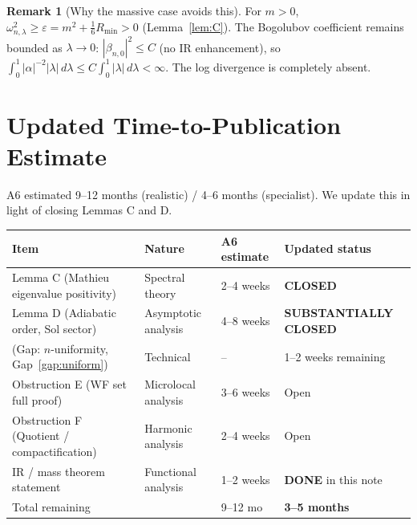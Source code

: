 \documentclass[11pt,a4paper]{article}
\theoremstyle{definition}
\newtheorem{remark}[theorem]{Remark}
\begin{document}
\begin{remark}[Why the massive case avoids this]
For $m > 0$, $\omega_{n,\lambda}^2 \geq \varepsilon = m^2 + \tfrac{1}{6}R_{\min} > 0$
(Lemma~\ref{lem:C}).  The Bogolubov coefficient remains bounded as $\lambda \to 0$:
$|\beta_{n,0}|^2 \leq C$ (no IR enhancement), so
$\int_0^1 |\alpha|^{-2}|\lambda|\,d\lambda \leq C\int_0^1 |\lambda|\,d\lambda < \infty$.
The log divergence is completely absent.
\end{remark}

\section{Updated Time-to-Publication Estimate}
\label{sec:timeline}

A6 estimated 9--12 months (realistic) / 4--6 months (specialist).
We update this in light of closing Lemmas C and D.

\medskip
\begin{center}
\renewcommand{\arraystretch}{1.3}
\begin{tabular}{llll}
\hline
Item & Nature & A6 estimate & Updated status \\
\hline
Lemma C (Mathieu eigenvalue positivity) & Spectral theory & 2--4 weeks & \textbf{CLOSED} \\
Lemma D (Adiabatic order, Sol sector) & Asymptotic analysis & 4--8 weeks & \textbf{SUBSTANTIALLY CLOSED} \\
\quad (Gap: $n$-uniformity, Gap~\ref{gap:uniform}) & Technical & -- & 1--2 weeks remaining \\
Obstruction E (WF set full proof) & Microlocal analysis & 3--6 weeks & Open \\
Obstruction F (Quotient / compactification) & Harmonic analysis & 2--4 weeks & Open \\
IR / mass theorem statement & Functional analysis & 1--2 weeks & \textbf{DONE} in this note \\
\hline
Total remaining & & 9--12 mo & \textbf{3--5 months} \\
\hline
\end{tabular}
\end{center}

\medskip
\end{document}
